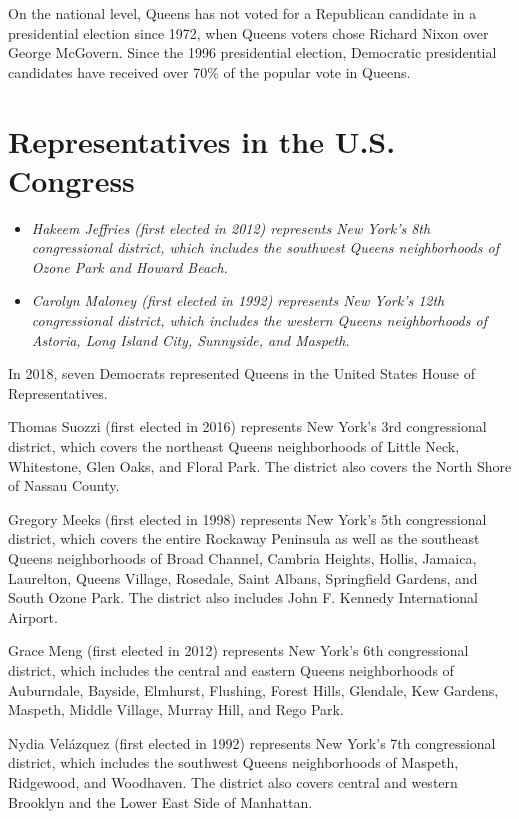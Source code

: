 On the national level, Queens has not voted for a Republican candidate
in a presidential election since 1972, when Queens voters chose Richard
Nixon over George McGovern. Since the 1996 presidential election,
Democratic presidential candidates have received over 70\% of the
popular vote in Queens.

\section{Representatives in the U.S.
Congress}\label{representatives-in-the-u.s.-congress}

\begin{itemize}
\item
  \emph{Hakeem Jeffries (first elected in 2012) represents New York's
  8th congressional district, which includes the southwest Queens
  neighborhoods of Ozone Park and Howard Beach.}
\item
  \emph{Carolyn Maloney (first elected in 1992) represents New York's
  12th congressional district, which includes the western Queens
  neighborhoods of Astoria, Long Island City, Sunnyside, and Maspeth.}
\end{itemize}

In 2018, seven Democrats represented Queens in the United States House
of Representatives.

Thomas Suozzi (first elected in 2016) represents New York's 3rd
congressional district, which covers the northeast Queens neighborhoods
of Little Neck, Whitestone, Glen Oaks, and Floral Park. The district
also covers the North Shore of Nassau County.

Gregory Meeks (first elected in 1998) represents New York's 5th
congressional district, which covers the entire Rockaway Peninsula as
well as the southeast Queens neighborhoods of Broad Channel, Cambria
Heights, Hollis, Jamaica, Laurelton, Queens Village, Rosedale, Saint
Albans, Springfield Gardens, and South Ozone Park. The district also
includes John F. Kennedy International Airport.

Grace Meng (first elected in 2012) represents New York's 6th
congressional district, which includes the central and eastern Queens
neighborhoods of Auburndale, Bayside, Elmhurst, Flushing, Forest Hills,
Glendale, Kew Gardens, Maspeth, Middle Village, Murray Hill, and Rego
Park.

Nydia Velázquez (first elected in 1992) represents New York's 7th
congressional district, which includes the southwest Queens
neighborhoods of Maspeth, Ridgewood, and Woodhaven. The district also
covers central and western Brooklyn and the Lower East Side of
Manhattan.

